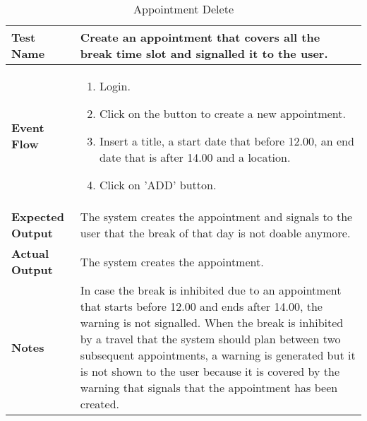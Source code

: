 \begin{table}[h]	
	\centering
	\def\arraystretch{1.5}
	\begin{tabular}{|m{7cm}|m{7cm}|}
		\hline
		\textbf{Test Name}            & Create an appointment that covers all the break time slot and signalled it to the user.\\ \hline
		\textbf{Event Flow}             & 
		\begin{enumerate}
			\item Login.
			\item Click on the button to create a new appointment.
			\item Insert a title, a start date that before 12.00, an end date that is after 14.00 and a location.
			\item Click on 'ADD' button.
		\end{enumerate} \\ \hline
		\textbf{Expected Output}  &  The system creates the appointment and signals to the user that the break of that day is not doable anymore.  \\ \hline
		\textbf{Actual Output}       & The system creates the appointment.   \\ \hline
		\textbf{Notes} & In case the break is inhibited due to an appointment that starts before 12.00 and ends after 14.00, the warning is not signalled. When the break is inhibited by a travel that the system should plan between two subsequent appointments, a warning is generated but it is not shown to the user because it is covered by the warning that signals that the appointment has been created. \\ \hline
	\end{tabular}
	\caption{Appointment Delete}
\end{table}


